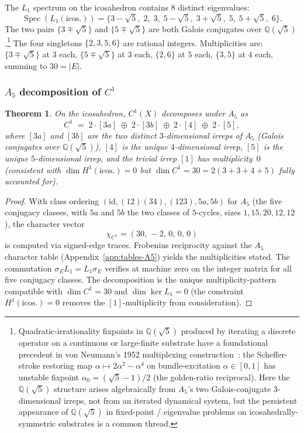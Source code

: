 \documentclass[12pt,a4paper]{article}
\newtheorem{theorem}{Theorem}[section]
\theoremstyle{definition}
\theoremstyle{remark}
\newcommand{\bQ}{\mathbb{Q}}                %
\DeclareMathOperator{\Spec}{Spec}
\providecommand{\id}{\mathrm{id}}
\begin{document}
The $L_1$ spectrum on the icosahedron contains $8$ distinct eigenvalues:
\[
  \Spec(L_1(\mathrm{icos.})) = \{3 - \sqrt 5,\; 2,\; 3,\; 5 - \sqrt 5,\;
  3 + \sqrt 5,\; 5,\; 5 + \sqrt 5,\; 6\}.
\]
The two pairs $\{3 \mp \sqrt 5\}$ and $\{5 \mp \sqrt 5\}$ are both
Galois conjugates over $\bQ(\sqrt 5)$.\footnote{Quadratic-irrationality
fixpoints in $\bQ(\sqrt 5)$ produced by iterating a discrete operator
on a continuous or large-finite substrate have a foundational
precedent in von Neumann's 1952 multiplexing
construction~\cite{vonNeumann1952}: the Scheffer-stroke restoring map
$\alpha \mapsto 2\alpha^2 - \alpha^4$ on bundle-excitation
$\alpha\in[0,1]$ has unstable fixpoint $\alpha_0 = (\sqrt 5 - 1)/2$
(the golden-ratio reciprocal). Here the $\bQ(\sqrt 5)$ structure
arises algebraically from $A_5$'s two Galois-conjugate
$3$-dimensional irreps, not from an iterated dynamical system, but
the persistent appearance of $\bQ(\sqrt 5)$ in fixed-point /
eigenvalue problems on icosahedrally-symmetric substrates is a common
thread.} The four singletons $\{2, 3, 5, 6\}$
are rational integers. Multiplicities are: $\{3 \mp \sqrt 5\}$ at $3$
each, $\{5 \mp \sqrt 5\}$ at $3$ each, $\{2, 6\}$ at $5$ each,
$\{3, 5\}$ at $4$ each, summing to $30 = |E|$.

\subsubsection{$A_5$ decomposition of $C^1$}\label{sec:icos-decomp}

\begin{theorem}\label{thm:icos-decomp}
On the icosahedron, $C^1(X)$ decomposes under $A_5$ as
\[
  C^1 \;=\; 2 \cdot [3a] \;\oplus\; 2 \cdot [3b] \;\oplus\; 2 \cdot [4]
    \;\oplus\; 2 \cdot [5],
\]
where $[3a]$ and $[3b]$ are the two distinct $3$-dimensional irreps of
$A_5$ (Galois conjugates over $\bQ(\sqrt 5)$), $[4]$ is the unique
$4$-dimensional irrep, $[5]$ is the unique $5$-dimensional irrep, and
the trivial irrep $[1]$ has multiplicity~$0$ (consistent with
$\dim H^1(\mathrm{icos.}) = 0$ but $\dim C^1 = 30 = 2(3 + 3 + 4 + 5)$
fully accounted for).
\end{theorem}

\begin{proof}
With class ordering $(\id, (12)(34), (123), 5a, 5b)$ for $A_5$ (the
five conjugacy classes, with $5a$ and $5b$ the two classes of $5$-cycles,
sizes $1, 15, 20, 12, 12$), the character vector
\[
  \chi_{C^1} = (30,\, -2,\, 0,\, 0,\, 0)
\]
is computed via signed-edge traces. Frobenius reciprocity against the $A_5$
character table (Appendix~\ref{app:tables-A5}) yields the multiplicities
stated. The commutation $\sigma_E L_1 = L_1 \sigma_E$ verifies at machine
zero on the integer matrix for all five conjugacy classes. The
decomposition is the unique multiplicity-pattern compatible with
$\dim C^1 = 30$ and $\dim \ker L_1 = 0$ (the constraint
$H^1(\mathrm{icos.}) = 0$ removes the $[1]$-multiplicity from
consideration).
\end{proof}
\end{document}
